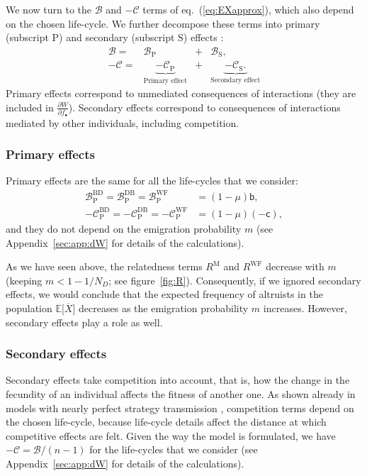 \documentclass[11pt, letterpaper]{article}
\renewcommand{\eqref}[1]{\textup{{\normalfont eq.~(\ref{#1}}\normalfont)}}
\newcommand{\derivn}[2]{\frac{\partial #1}{\partial #2}}
\newcommand{\Esp}[1]{\mathbb{E}\big[ #1\big]}%
\newcommand{\appname}[0]{Appendix}
\newcommand{\bb}{\mathsf{b}}
\newcommand{\cc}{\mathsf{c}}
\newcommand{\Moran}{\textrm{M}}
\newcommand{\BD}{\textrm{BD}}
\newcommand{\DB}{\textrm{DB}}
\newcommand{\WF}{\textrm{WF}}
\newcommand{\focal}{\bullet}
\newcommand{\prim}{\textrm{P}}
\newcommand{\secd}{\textrm{S}}
\newcommand{\ndemes}{N_D}
\begin{document}
We now turn to the $\mathcal{B}$ and $-\mathcal{C}$ terms of \eqref{eq:EXapprox}, which also depend on the chosen life-cycle. We further decompose these terms into primary (subscript $\prim$) and secondary (subscript $\secd$) effects \citep{WestGardner2010}: 
\begin{equation}
\begin{array}{rccc}
\mathcal{B} =&  \mathcal{B}_{\prim} &+& \mathcal{B}_{\secd},\\
-\mathcal{C} =& \underbrace{-\mathcal{C}_{\prim}}_{\textrm{Primary effect}} &+& \underbrace{-\mathcal{C}_{\secd}.}_{\textrm{Secondary effect}}
%
\end{array}
\end{equation} 
%
Primary effects correspond to unmediated consequences of interactions (they are included in $\derivn{W}{f_{\focal}}$). Secondary effects correspond to consequences of interactions mediated by other individuals, including competition. 


\subsubsection*{Primary effects}
%
Primary effects are the same for all the life-cycles that we consider:
\begin{subequations}
\begin{align}
\mathcal{B}_{\prim}^{\BD} = \mathcal{B}_{\prim}^{\DB} = \mathcal{B}_{\prim}^{\WF} &= (1-\mu) \bb, \\
-\mathcal{C}_{\prim}^{\BD} = -\mathcal{C}_{\prim}^{\DB} = -\mathcal{C}_{\prim}^{\WF} &= (1-\mu) (-\cc),
\end{align}
\end{subequations}
%
and they do not depend on the emigration probability $m$ (see \appname~\ref{sec:app:dW} for details of the calculations). 

As we have seen above, the relatedness terms $R^{\Moran}$ and $R^{\WF}$ decrease with $m$ (keeping $m<1 - 1/\ndemes$; see figure~\ref{fig:R}). Consequently, if we ignored secondary effects, we would conclude that the expected frequency of altruists in the population $\Esp{\overline{X}}$ decreases as the emigration probability $m$ increases. However, secondary effects play a role as well.

\subsubsection*{Secondary effects}

Secondary effects take competition into account, that is, how the change in the fecundity of an individual affects the fitness of another one. As shown already in models with nearly perfect strategy transmission \citep{GrafenArchetti2008}, competition terms depend on the chosen life-cycle, because life-cycle details affect the distance at which competitive effects are felt. Given the way the model is formulated, we have $-\mathcal{C} = \mathcal{B}/(n-1)$ for the life-cycles that we consider (see \appname~\ref{sec:app:dW} for details of the calculations). 
\end{document}
